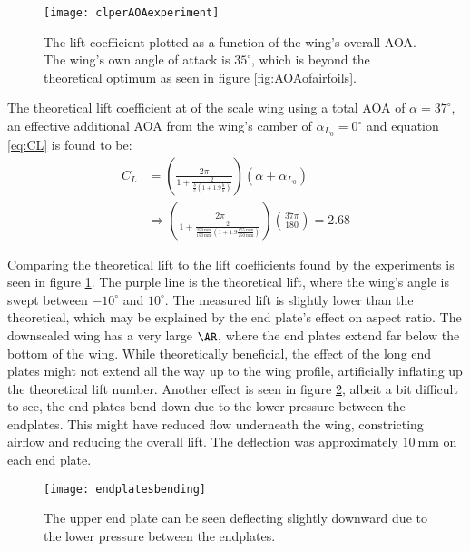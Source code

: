   \begin{figure}
    \texttt{[image: clperAOAexperiment]}
    \caption{The lift coefficient plotted as a function of the wing's overall AOA. The wing's own angle of attack is $35^\circ$, which is beyond the theoretical optimum as seen in figure \ref{fig:AOAofairfoils}.}
    \label{fig:clperAOAexperiment}
  \end{figure}

  The theoretical lift coefficient at of the scale wing using a total AOA of $\alpha = 37^\circ$, an effective additional AOA from the wing's camber of $\alpha_{L_0} = 0^\circ$ and equation \ref{eq:CL} is found to be:
  \begin{align*}
    C_L &= \left(\frac{2\pi}{1+\frac{2}{\frac{b}{c}\left(1+1.9\frac{h}{b}\right)}}\right)\left(\alpha + \alpha_{L_0}\right)\\
    &\Rightarrow
    \left(\frac{2\pi}{1+\frac{2}{\frac{\SI{250}{\milli\metre}}{\SI{150}{\milli\metre}}\left(1+1.9\frac{\SI{175}{\milli\metre}}{\SI{250}{\milli\metre}}\right)}}\right)\left(\frac{37\pi}{180}\right) = 2.68
  \end{align*}

  Comparing the theoretical lift to the lift coefficients found by the experiments is seen in figure \ref{fig:clperAOAexperiment}. The purple line is the theoretical lift, where the wing's angle is swept between $-10^\circ$ and $10^\circ$. The measured lift is slightly lower than the theoretical, which may be explained by the end plate's effect on aspect ratio. The downscaled wing has a very large $\AR$, where the end plates extend far below the bottom of the wing. While theoretically beneficial, the effect of the long end plates might not extend all the way up to the wing profile, artificially inflating up the theoretical lift number. Another effect is seen in figure \ref{fig:endplatesbending}, albeit a bit difficult to see, the end plates bend down due to the lower pressure between the endplates. This might have reduced flow underneath the wing, constricting airflow and reducing the overall lift. The deflection was approximately $\SI{10}{\milli\metre}$ on each end plate.

  \begin{figure}
    \texttt{[image: endplatesbending]}
    \caption{The upper end plate can be seen deflecting slightly downward due to the lower pressure between the endplates.}
    \label{fig:endplatesbending}
  \end{figure}
